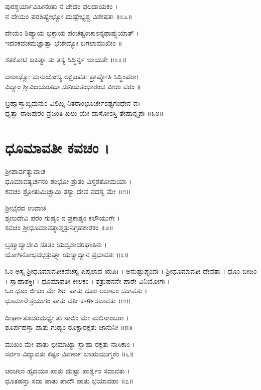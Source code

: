 ಪುರಶ್ಚರ್ಯಾವಿಹೀನಂತು ನ ಚೇದಂ ಫಲದಾಯಕಂ ।\\
ನ ದೇಯಂ ಪರಶಿಷ್ಯೇಭ್ಯೋ ದುಷ್ಟೇಭ್ಯಶ್ಚ ವಿಶೇಷತಃ ॥೩೬॥

ದೇಯಂ ಶಿಷ್ಯಾಯ ಭಕ್ತಾಯ ಪಂಚತ್ವಂಚಾಽನ್ಯಥಾಪ್ನುಯಾತ್ ।\\
ಇದಂಕವಚಮಜ್ಞಾತ್ವಾ ಭಜೇದ್ಯೋ ಬಗಲಾಮುಖೀಂ ॥

ಶತಕೋಟಿ ಜಪಿತ್ವಾ ತು ತಸ್ಯ ಸಿದ್ಧಿರ್ನ್ನ ಜಾಯತೇ ॥೩೭॥

ದಾರಾಢ್ಯೋ ಮನುಜೋಸ್ಯ ಲಕ್ಷಜಪತಃ ಪ್ರಾಪ್ನೋತಿ ಸಿದ್ಧಿಂಪರಾ।\\
ವಿದ್ಯಾಂ ಶ್ರೀವಿಜಯಂತಥಾ ಸುನಿಯತಂಧಾರಂಚ ವೀರಂ ವರಂ ॥

ಬ್ರಹ್ಮಾಸ್ತ್ರಾಖ್ಯಮನುಂ ವಿಲಿಖ್ಯ ನಿತರಾಂಭೂರ್ಜೇಽಷ್ಟಗಂಧೇನ ವ।\\
ಧೃತ್ವಾ ರಾಜಪುರಂ ವ್ರಜಂತಿ ಖಲು ಯೇ ದಾಸೋಽಸ್ತಿ ತೇಷಾನ್ನೃಪಃ ॥೩೮॥

\section{ಧೂಮಾವತೀ ಕವಚಂ ।}
ಶ್ರೀಪಾರ್ವತ್ಯುವಾಚ\\
ಧೂಮಾವತ್ಯರ್ಚನಂ ಶಂಭೋ ಶ್ರುತಂ ವಿಸ್ತರತೋಮಯಾ ।\\
ಕವಚಂ ಶ್ರೋತುಮಿಚ್ಛಾಮಿ ತಸ್ಯಾ ದೇವ ವದಸ್ವ ಮೇ ॥೧॥

ಶ್ರೀಭೈರವ ಉವಾಚ\\
ಶೃಣುದೇವಿ ಪರಂ ಗುಹ್ಯಂ ನ ಪ್ರಕಾಶ್ಯಂ ಕಲೌಯುಗೇ ।\\
ಕವಚಂ ಶ್ರೀಧೂಮಾವತ್ಯಾಶ್ಶತ್ರುನಿಗ್ರಹಕಾರಕಂ ॥೨॥

ಬ್ರಹ್ಮಾದ್ಯಾದೇವಿ ಸತತಂ ಯದ್ವಶಾದರಿಘಾತಿನಃ ।\\
ಯೋಗಿನೋಭವಛತ್ರುಘ್ನಾ ಯಸ್ಯಾಧ್ಯಾನ ಪ್ರಭಾವತಃ ॥೩॥

ಓಂ ಅಸ್ಯ ಶ್ರೀಧೂಮಾವತೀಕವಚಸ್ಯ ಪಿಪ್ಪಲಾದ ಋಷಿಃ । ಅನುಷ್ಟುಪ್ಛಂದಃ । ಶ್ರೀಧೂಮಾವತೀ ದೇವತಾ । ಧೂಂ ಬೀಜಂ । ಸ್ವಾಹಾಶಕ್ತಿಃ । ಧೂಮಾವತೀ ಕೀಲಕಂ । ಶತ್ರುಹನನೇ ಪಾಠೇ ವಿನಿಯೋಗಃ ।\\

ಓಂ ಧೂಂ ಬೀಜಂ ಮೇ ಶಿರಃ ಪಾತು ಧೂಂ ಲಲಾಟಂ ಸದಾವತು ।\\
ಧೂಮಾನೇತ್ರಯುಗಂ ಪಾತು ವತೀ ಕರ್ಣೌಸದಾವತು ॥೪॥

ದೀರ್ಘಾತೂದರಮಧ್ಯೇ ತು ನಾಭಿಂ ಮೇ ಮಲಿನಾಂಬರಾ ।\\
ಶೂರ್ಪಹಸ್ತಾ ಪಾತು ಗುಹ್ಯಂ ರೂಕ್ಷಾರಕ್ಷತು ಜಾನುನೀ ॥೫॥

ಮುಖಂ ಮೇ ಪಾತು ಭೀಮಾಖ್ಯಾ ಸ್ವಾಹಾ ರಕ್ಷತು ನಾಸಿಕಾಂ ।\\
ಸರ್ವಂ ವಿದ್ಯಾವತು ಕಷ್ಟಂ ವಿವರ್ಣಾ ಬಾಹುಯುಗ್ಮಕಂ ॥೬॥

ಚಂಚಲಾ ಹೃದಯಂ ಪಾತು ದುಷ್ಟಾ ಪಾರ್ಶ್ವಂ ಸದಾವತು ।\\
ಧೂತಹಸ್ತಾ ಸದಾ ಪಾತು ಪಾದೌ ಪಾತು ಭಯಾವಹಾ ॥೭॥

